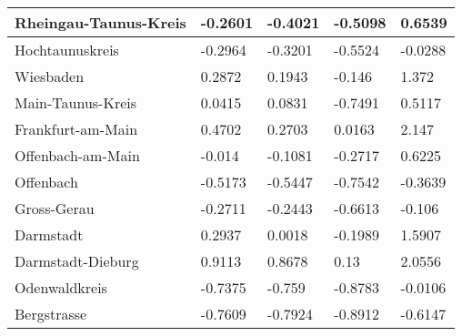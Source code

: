 \begin{table}
\begin{tabular}{|l||x{2cm}|x{2cm}|x{2cm}|x{2cm}|}
		Rheingau-Taunus-Kreis & -0.2601 & -0.4021 & -0.5098 & 0.6539 \\ \hline
		Hochtaunuskreis & -0.2964 & -0.3201 & -0.5524 & -0.0288 \\ \hline
		Wiesbaden & 0.2872 & 0.1943 & -0.146 & 1.372 \\ \hline
		Main-Taunus-Kreis & 0.0415 & 0.0831 & -0.7491 & 0.5117 \\ \hline
		Frankfurt-am-Main & 0.4702 & 0.2703 & 0.0163 & 2.147 \\ \hline
		Offenbach-am-Main & -0.014 & -0.1081 & -0.2717 & 0.6225 \\ \hline
		Offenbach & -0.5173 & -0.5447 & -0.7542 & -0.3639 \\ \hline
		Gross-Gerau & -0.2711 & -0.2443 & -0.6613 & -0.106 \\ \hline
		Darmstadt & 0.2937 & 0.0018 & -0.1989 & 1.5907 \\ \hline
		Darmstadt-Dieburg & 0.9113 & 0.8678 & 0.13 & 2.0556 \\ \hline
		Odenwaldkreis & -0.7375 & -0.759 & -0.8783 & -0.0106 \\ \hline
		Bergstrasse & -0.7609 & -0.7924 & -0.8912 & -0.6147 \\ \hline
	\end{tabular}
	\label{tab:76_perc_dev}
\end{table}


																									
